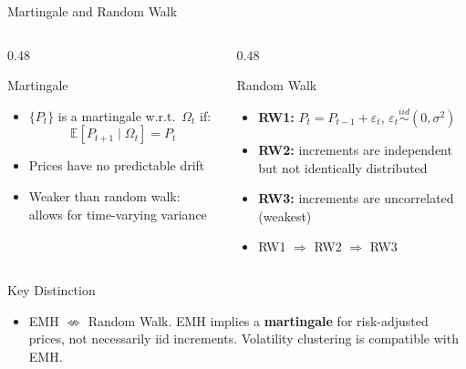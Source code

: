 \documentclass[9pt, aspectratio=169, t]{beamer}
\theoremstyle{definition}
\newenvironment{cminipage}[1]{%
    \par\noindent\hfill\begin{minipage}{#1}\ignorespaces
}{%
    \end{minipage}\hfill\null\par
}
\newcommand{\E}{\mathbb{E}}
\begin{document}
\begin{frame}{Martingale and Random Walk}
\begin{cminipage}{0.95\textwidth}
\begin{columns}[T]
\begin{column}{0.48\textwidth}
\begin{block}{Martingale}
\begin{itemize}\setlength{\itemsep}{0pt}
    \item $\{P_t\}$ is a martingale w.r.t.\ $\Omega_t$ if:
    $$\E[P_{t+1} \mid \Omega_t] = P_t$$
    \item Prices have no predictable drift
    \item Weaker than random walk: allows for time-varying variance
\end{itemize}
\end{block}
\end{column}
\begin{column}{0.48\textwidth}
\begin{block}{Random Walk}
\begin{itemize}\setlength{\itemsep}{0pt}
    \item \textbf{RW1:} $P_t = P_{t-1} + \varepsilon_t$, $\varepsilon_t \stackrel{iid}{\sim}(0, \sigma^2)$
    \item \textbf{RW2:} increments are independent but not identically distributed
    \item \textbf{RW3:} increments are uncorrelated (weakest)
    \item RW1 $\Rightarrow$ RW2 $\Rightarrow$ RW3
\end{itemize}
\end{block}
\end{column}
\end{columns}

\vspace{0.3cm}
\begin{alertblock}{Key Distinction}
\begin{itemize}\setlength{\itemsep}{0pt}
    \item EMH $\not\Leftrightarrow$ Random Walk. EMH implies a \textbf{martingale} for risk-adjusted prices, not necessarily iid increments. Volatility clustering is compatible with EMH.
\end{itemize}
\end{alertblock}
\end{cminipage}
\end{frame}
\end{document}
